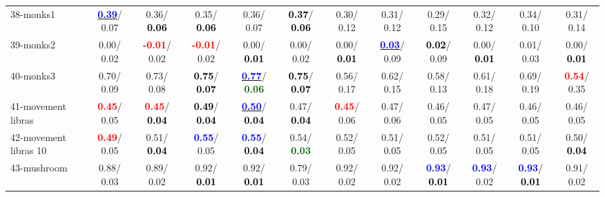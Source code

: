 \begin{table}[h]
\begin{center}
{\begin{tabular}{lc|c|c|c|c|c|c|c|c|c|c}
38-monks1 & \underline{\textcolor{blue}{\textbf{  0.39}}}/  0.07 &   0.36/\textcolor{black}{\textbf{  0.06}} &   0.35/\textcolor{black}{\textbf{  0.06}} &   0.36/  0.07 & \textcolor{black}{\textbf{  0.37}}/\textcolor{black}{\textbf{  0.06}} &   0.30/  0.12 &   0.31/  0.12 &   0.29/  0.15 &   0.32/  0.12 &   0.34/  0.10 &   0.31/  0.14 \\
39-monks2 &   0.00/  0.02 & \textcolor{red}{\textbf{ -0.01}}/  0.02 & \textcolor{red}{\textbf{ -0.01}}/  0.02 &   0.00/\textcolor{black}{\textbf{  0.01}} &   0.00/  0.02 &   0.00/\textcolor{black}{\textbf{  0.01}} & \underline{\textcolor{blue}{\textbf{  0.03}}}/  0.09 & \textcolor{black}{\textbf{  0.02}}/  0.09 &   0.00/\textcolor{black}{\textbf{  0.01}} &   0.01/  0.03 &   0.00/\textcolor{black}{\textbf{  0.01}} \\ \hline
40-monks3 &   0.70/  0.09 &   0.73/  0.08 & \textcolor{black}{\textbf{  0.75}}/\textcolor{black}{\textbf{  0.07}} & \underline{\textcolor{blue}{\textbf{  0.77}}}/\textcolor{darkgreen}{\textbf{  0.06}} & \textcolor{black}{\textbf{  0.75}}/\textcolor{black}{\textbf{  0.07}} &   0.56/  0.17 &   0.62/  0.15 &   0.58/  0.13 &   0.61/  0.18 &   0.69/  0.19 & \textcolor{red}{\textbf{  0.54}}/  0.35 \\
41-movement libras & \textcolor{red}{\textbf{  0.45}}/  0.05 & \textcolor{red}{\textbf{  0.45}}/\textcolor{black}{\textbf{  0.04}} & \textcolor{black}{\textbf{  0.49}}/\textcolor{black}{\textbf{  0.04}} & \underline{\textcolor{blue}{\textbf{  0.50}}}/\textcolor{black}{\textbf{  0.04}} &   0.47/\textcolor{black}{\textbf{  0.04}} & \textcolor{red}{\textbf{  0.45}}/  0.06 &   0.47/  0.06 &   0.46/  0.05 &   0.47/  0.05 &   0.46/  0.05 &   0.46/  0.05 \\
42-movement libras 10 & \textcolor{red}{\textbf{  0.49}}/  0.05 &   0.51/\textcolor{black}{\textbf{  0.04}} & \textcolor{blue}{\textbf{  0.55}}/  0.05 & \textcolor{blue}{\textbf{  0.55}}/\textcolor{black}{\textbf{  0.04}} &   0.54/\textcolor{darkgreen}{\textbf{  0.03}} &   0.52/  0.05 &   0.51/  0.05 &   0.52/  0.05 &   0.51/  0.05 &   0.51/  0.05 &   0.50/\textcolor{black}{\textbf{  0.04}} \\
43-mushroom &   0.88/  0.03 &   0.89/  0.02 &   0.92/\textcolor{black}{\textbf{  0.01}} &   0.92/\textcolor{black}{\textbf{  0.01}} &   0.79/  0.03 &   0.92/  0.02 &   0.92/  0.02 & \textcolor{blue}{\textbf{  0.93}}/\textcolor{black}{\textbf{  0.01}} & \textcolor{blue}{\textbf{  0.93}}/  0.02 & \textcolor{blue}{\textbf{  0.93}}/\textcolor{black}{\textbf{  0.01}} &   0.91/  0.02 \\

\end{tabular}}
\end{center}
\end{table}
